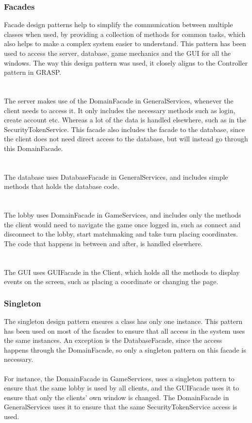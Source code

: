 			\subsubsection{Facades}
Facade design patterns help to simplify the communication between multiple
classes when used, by providing a collection of methods for common tasks,
 which also helps to make a complex system easier to understand. This pattern
 has been used to access the server, database, game mechanics and the GUI for all the windows.
The way this design pattern was used, it closely aligns to the Controller pattern in GRASP.
\\
\\
\\
The server makes use of the DomainFacade in GeneralServices, whenever the
client needs to access it. It only includes the necessary methods such as
login, create account etc. Whereas a lot of the data is handled elsewhere,
 such as in the SecurityTokenService. This facade also includes the facade
 to the database, since the client does not need direct access to the database,
  but will instead go through this DomainFacade.
\\
\\
\\
The database uses DatabaseFacade in GeneralServices, and includes simple
methods that holds the database code.
\\
\\
\\
The lobby uses DomainFacade in GameServices, and includes only the methods
the client would need to navigate the game once logged in, such as connect
and disconnect to the lobby, start matchmaking and take turn placing
 coordinates. The code that happens in between and after, is handled elsewhere.
\\
\\
\\
The GUI uses GUIFacade in the Client, which holds all the methods to
display events on the screen, such as placing a coordinate or changing the page.
			\subsubsection{Singleton}
The singleton design pattern ensures a class has only one instance.
This pattern has been used on most of the facades to ensure that all access
 in the system uses the same instances. An exception is the DatabaseFacade,
  since the access happens through the DomainFacade, so only a singleton
	 pattern on this facade is necessary.
\\
\\
For instance, the DomainFacade in GameServices, uses a singleton pattern
to ensure that the same lobby is used by all clients, and the GUIFacade uses
 it to ensure that only the clients’ own window is changed. The DomainFacade
  in GeneralServices uses it to ensure that the same SecurityTokenService access is used.
